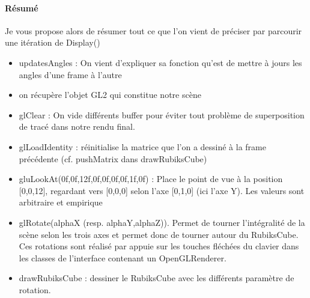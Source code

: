 \paragraph{Résumé}
Je vous propose alors de résumer tout ce que l’on vient de préciser par parcourir une itération de Display()
\begin{itemize}
   \item  updatesAngles : On vient d’expliquer sa fonction qu’est de mettre à jours les angles d’une frame à l’autre

    \item on récupère l’objet GL2 qui constitue notre scène

    \item glClear : On vide différents buffer pour éviter tout problème de superposition de tracé dans notre rendu final.

    \item glLoadIdentity : réinitialise la matrice que l’on a dessiné à la frame précédente (cf. pushMatrix dans drawRubiksCube)

    \item gluLookAt(0f,0f,12f,0f,0f,0f,0f,1f,0f) : Place le point de vue à la position [0,0,12], regardant vers [0,0,0] selon l’axe [0,1,0] (ici l’axe Y). Les valeurs sont arbitraire et empirique

    \item glRotate(alphaX (resp. alphaY,alphaZ)). Permet de tourner l’intégralité de la scène selon les trois axes et permet donc de tourner autour du RubiksCube. Ces rotations sont réalisé par appuie sur les touches fléchées du clavier dans les classes de l’interface contenant un OpenGLRenderer.

    \item drawRubiksCube : dessiner le RubiksCube avec les différents paramètre de rotation.
\end{itemize}















